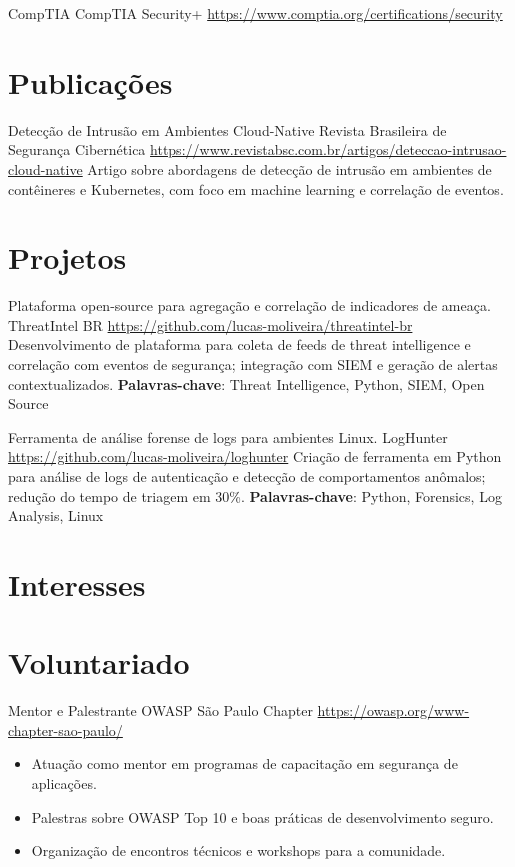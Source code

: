 \documentclass[a4paper, serif, 10pt]{moderncv}
\begin{document}
        {CompTIA}
        {CompTIA Security+}
        {\url{https://www.comptia.org/certifications/security}}
        {}
        {}
\section{Publicações}

        {Detecção de Intrusão em Ambientes Cloud-Native}
        {Revista Brasileira de Segurança Cibernética}
        {\url{https://www.revistabsc.com.br/artigos/deteccao-intrusao-cloud-native}}
        {}
        {Artigo sobre abordagens de detecção de intrusão em ambientes de contêineres e Kubernetes, com foco em machine learning e correlação de eventos.}
\section{Projetos}

        {Plataforma open-source para agregação e correlação de indicadores de ameaça.}
        {ThreatIntel BR}
        {\url{https://github.com/lucas-moliveira/threatintel-br}}
        {}
        {Desenvolvimento de plataforma para coleta de feeds de threat intelligence e correlação com eventos de segurança; integração com SIEM e geração de alertas contextualizados.
\textbf{Palavras-chave}: Threat Intelligence, Python, SIEM, Open Source}

        {Ferramenta de análise forense de logs para ambientes Linux.}
        {LogHunter}
        {\url{https://github.com/lucas-moliveira/loghunter}}
        {}
        {Criação de ferramenta em Python para análise de logs de autenticação e detecção de comportamentos anômalos; redução do tempo de triagem em 30\%.
\textbf{Palavras-chave}: Python, Forensics, Log Analysis, Linux}
\section{Interesses}

\section{Voluntariado}

        {Mentor e Palestrante}
        {OWASP São Paulo Chapter}
        {\url{https://owasp.org/www-chapter-sao-paulo/}}
        {}
        {\begin{itemize}
\item Atuação como mentor em programas de capacitação em segurança de aplicações.
\item Palestras sobre OWASP Top 10 e boas práticas de desenvolvimento seguro.
\item Organização de encontros técnicos e workshops para a comunidade.
\end{itemize}}
    
\end{document}
